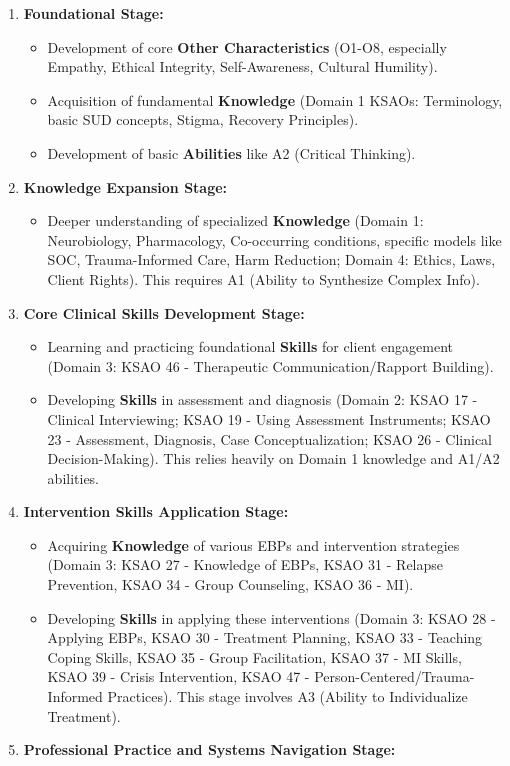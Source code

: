 \documentclass[
  letterpaper,
  DIV=11,
  numbers=noendperiod]{scrartcl}
\providecommand{\tightlist}{%
  \setlength{\itemsep}{0pt}\setlength{\parskip}{0pt}}
\begin{document}
\begin{enumerate}
\def\labelenumi{\arabic{enumi}.}
\tightlist
\item
  \textbf{Foundational Stage:}

  \begin{itemize}
  \tightlist
  \item
    Development of core \textbf{Other Characteristics} (O1-O8,
    especially Empathy, Ethical Integrity, Self-Awareness, Cultural
    Humility).
  \item
    Acquisition of fundamental \textbf{Knowledge} (Domain 1 KSAOs:
    Terminology, basic SUD concepts, Stigma, Recovery Principles).
  \item
    Development of basic \textbf{Abilities} like A2 (Critical Thinking).
  \end{itemize}
\item
  \textbf{Knowledge Expansion Stage:}

  \begin{itemize}
  \tightlist
  \item
    Deeper understanding of specialized \textbf{Knowledge} (Domain 1:
    Neurobiology, Pharmacology, Co-occurring conditions, specific models
    like SOC, Trauma-Informed Care, Harm Reduction; Domain 4: Ethics,
    Laws, Client Rights). This requires A1 (Ability to Synthesize
    Complex Info).
  \end{itemize}
\item
  \textbf{Core Clinical Skills Development Stage:}

  \begin{itemize}
  \tightlist
  \item
    Learning and practicing foundational \textbf{Skills} for client
    engagement (Domain 3: KSAO 46 - Therapeutic Communication/Rapport
    Building).
  \item
    Developing \textbf{Skills} in assessment and diagnosis (Domain 2:
    KSAO 17 - Clinical Interviewing; KSAO 19 - Using Assessment
    Instruments; KSAO 23 - Assessment, Diagnosis, Case
    Conceptualization; KSAO 26 - Clinical Decision-Making). This relies
    heavily on Domain 1 knowledge and A1/A2 abilities.
  \end{itemize}
\item
  \textbf{Intervention Skills Application Stage:}

  \begin{itemize}
  \tightlist
  \item
    Acquiring \textbf{Knowledge} of various EBPs and intervention
    strategies (Domain 3: KSAO 27 - Knowledge of EBPs, KSAO 31 - Relapse
    Prevention, KSAO 34 - Group Counseling, KSAO 36 - MI).
  \item
    Developing \textbf{Skills} in applying these interventions (Domain
    3: KSAO 28 - Applying EBPs, KSAO 30 - Treatment Planning, KSAO 33 -
    Teaching Coping Skills, KSAO 35 - Group Facilitation, KSAO 37 - MI
    Skills, KSAO 39 - Crisis Intervention, KSAO 47 -
    Person-Centered/Trauma-Informed Practices). This stage involves A3
    (Ability to Individualize Treatment).
  \end{itemize}
\item
  \textbf{Professional Practice and Systems Navigation Stage:}


\end{enumerate}
\end{document}
